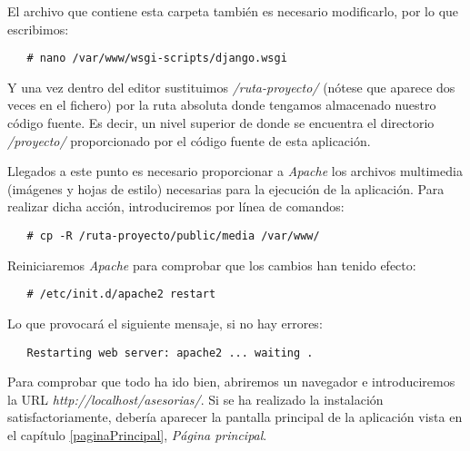    El archivo que contiene esta carpeta también es necesario modificarlo, por
   lo que escribimos:

   \begin{verbatim}
   # nano /var/www/wsgi-scripts/django.wsgi
   \end{verbatim}

   Y una vez dentro del editor sustituimos \textit{/ruta-proyecto/} (nótese que
   aparece dos veces en el fichero) por la ruta absoluta donde tengamos
   almacenado nuestro código fuente. Es decir, un nivel superior de donde se
   encuentra el directorio \textit{/proyecto/} proporcionado por el código
   fuente de esta aplicación.

   Llegados a este punto es necesario proporcionar a \textit{Apache} los
   archivos multimedia (imágenes y hojas de estilo) necesarias para la ejecución
   de la aplicación. Para realizar dicha acción, introduciremos por línea de
   comandos:

   \begin{verbatim}
   # cp -R /ruta-proyecto/public/media /var/www/
   \end{verbatim}

   Reiniciaremos \textit{Apache} para comprobar que los cambios han tenido
   efecto:

   \begin{verbatim}
   # /etc/init.d/apache2 restart
   \end{verbatim}

   Lo que provocará el siguiente mensaje, si no hay errores:

   \begin{verbatim}
   Restarting web server: apache2 ... waiting .
   \end{verbatim}

   Para comprobar que todo ha ido bien, abriremos un navegador e introduciremos
   la URL \textit{http://localhost/asesorias/}. Si se ha realizado la
   instalación satisfactoriamente, debería aparecer la pantalla principal
   de la aplicación vista en el capítulo \ref{paginaPrincipal},
   \textit{Página principal}.